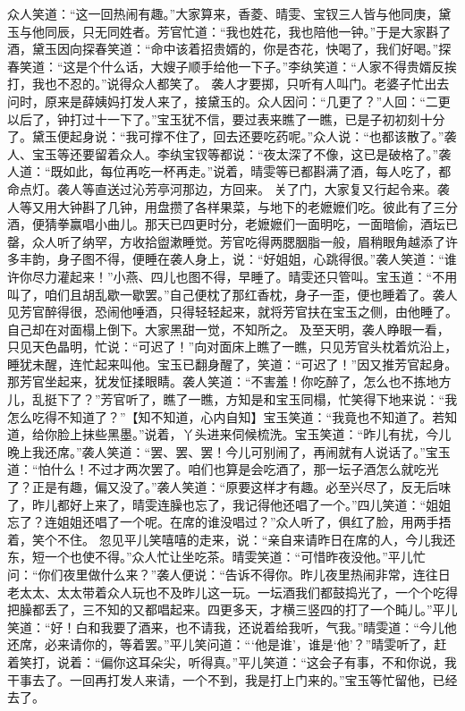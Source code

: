 \documentclass[12pt,oneside]{book}
\begin{document}
众人笑道：“这一回热闹有趣。”大家算来，香菱、晴雯、宝钗三人皆与他同庚，黛玉与他同辰，只无同姓者。芳官忙道：“我也姓花，我也陪他一钟。”于是大家斟了酒，黛玉因向探春笑道：“命中该着招贵婿的，你是杏花，快喝了，我们好喝。”探春笑道：“这是个什么话，大嫂子顺手给他一下子。”李纨笑道：“人家不得贵婿反挨打，我也不忍的。”说得众人都笑了。
袭人才要掷，只听有人叫门。老婆子忙出去问时，原来是薛姨妈打发人来了，接黛玉的。众人因问：“几更了？”人回：“二更以后了，钟打过十一下了。”宝玉犹不信，要过表来瞧了一瞧，已是子初初刻十分了。黛玉便起身说：“我可撑不住了，回去还要吃药呢。”众人说：“也都该散了。”袭人、宝玉等还要留着众人。李纨宝钗等都说：“夜太深了不像，这已是破格了。”袭人道：“既如此，每位再吃一杯再走。”说着，晴雯等已都斟满了酒，每人吃了，都命点灯。袭人等直送过沁芳亭河那边，方回来。
关了门，大家复又行起令来。袭人等又用大钟斟了几钟，用盘攒了各样果菜，与地下的老嬷嬷们吃。彼此有了三分酒，便猜拳赢唱小曲儿。那天已四更时分，老嬷嬷们一面明吃，一面暗偷，酒坛已罄，众人听了纳罕，方收拾盥漱睡觉。芳官吃得两腮胭脂一般，眉稍眼角越添了许多丰韵，身子图不得，便睡在袭人身上，说：“好姐姐，心跳得很。”袭人笑道：“谁许你尽力灌起来！”小燕、四儿也图不得，早睡了。晴雯还只管叫。宝玉道：“不用叫了，咱们且胡乱歇一歇罢。”自己便枕了那红香枕，身子一歪，便也睡着了。袭人见芳官醉得很，恐闹他唾酒，只得轻轻起来，就将芳官扶在宝玉之侧，由他睡了。自己却在对面榻上倒下。大家黑甜一觉，不知所之。
及至天明，袭人睁眼一看，只见天色晶明，忙说：“可迟了！”向对面床上瞧了一瞧，只见芳官头枕着炕沿上，睡犹未醒，连忙起来叫他。宝玉已翻身醒了，笑道：“可迟了！”因又推芳官起身。那芳官坐起来，犹发怔揉眼睛。袭人笑道：“不害羞！你吃醉了，怎么也不拣地方儿，乱挺下了？”芳官听了，瞧了一瞧，方知是和宝玉同榻，忙笑得下地来说：“我怎么吃得不知道了？”【知不知道，心内自知】宝玉笑道：“我竟也不知道了。若知道，给你脸上抹些黑墨。”说着，丫头进来伺候梳洗。宝玉笑道：“昨儿有扰，今儿晚上我还席。”袭人笑道：“罢、罢、罢！今儿可别闹了，再闹就有人说话了。”宝玉道：“怕什么！不过才两次罢了。咱们也算是会吃酒了，那一坛子酒怎么就吃光了？正是有趣，偏又没了。”袭人笑道：“原要这样才有趣。必至兴尽了，反无后味了，昨儿都好上来了，晴雯连臊也忘了，我记得他还唱了一个。”四儿笑道：“姐姐忘了？连姐姐还唱了一个呢。在席的谁没唱过？”众人听了，俱红了脸，用两手捂着，笑个不住。
忽见平儿笑嘻嘻的走来，说：“亲自来请昨日在席的人，今儿我还东，短一个也使不得。”众人忙让坐吃茶。晴雯笑道：“可惜昨夜没他。”平儿忙问：“你们夜里做什么来？”袭人便说：“告诉不得你。昨儿夜里热闹非常，连往日老太太、太太带着众人玩也不及昨儿这一玩。一坛酒我们都鼓捣光了，一个个吃得把臊都丢了，三不知的又都唱起来。四更多天，才横三竖四的打了一个盹儿。”平儿笑道：“好！白和我要了酒来，也不请我，还说着给我听，气我。”晴雯道：“今儿他还席，必来请你的，等着罢。”平儿笑问道：“‘他是谁’，谁是‘他’？”晴雯听了，赶着笑打，说着：“偏你这耳朵尖，听得真。”平儿笑道：“这会子有事，不和你说，我干事去了。一回再打发人来请，一个不到，我是打上门来的。”宝玉等忙留他，已经去了。
\end{document}
